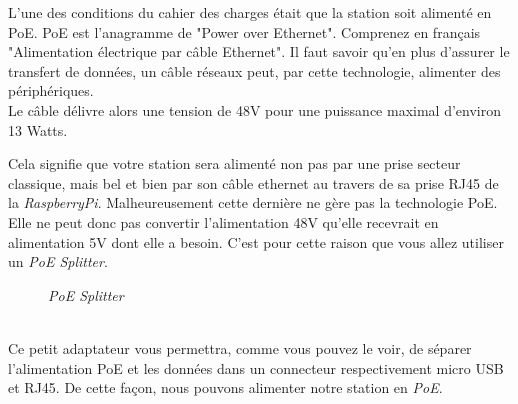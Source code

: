 L'une des conditions du cahier des charges était que la station soit alimenté en PoE. PoE est l'anagramme de "Power over Ethernet". Comprenez en français "Alimentation électrique par câble Ethernet". Il faut savoir qu'en plus d'assurer le transfert de données, un câble réseaux peut, par cette technologie, alimenter des périphériques.\\

Le câble délivre alors une tension de 48V pour une puissance maximal d'environ 13 Watts. 

	Cela signifie que votre station sera alimenté non pas par une prise secteur classique, mais bel et bien par son câble ethernet au travers de sa prise RJ45 de la \textit{RaspberryPi}. Malheureusement cette dernière ne gère pas la technologie PoE. Elle ne peut donc pas convertir l'alimentation 48V qu'elle recevrait en alimentation 5V dont elle a besoin. C'est pour cette raison que vous allez utiliser un \textit{PoE Splitter}.
	
	\begin{figure}[H]
	\begin{center}
	\end{center}
		\caption{ \textit{PoE Splitter}}
	\end{figure}\\
	
Ce petit adaptateur vous permettra, comme vous pouvez le voir, de séparer l'alimentation PoE et les données dans un connecteur respectivement micro USB et RJ45. De cette façon, nous pouvons alimenter notre station en \textit{PoE}.